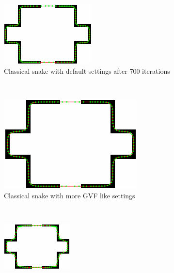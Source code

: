 \documentclass[a4paper]{article}
\begin{document}
\begin{figure}
	\centering
	\begin{subfigure}[t]{.3\textwidth}
		\includegraphics[width=\textwidth]{firstclass}
		\caption{Classical snake with default settings after 700 iterations}
	\end{subfigure}~
	\begin{subfigure}[t]{.3\textwidth}
		\includegraphics[width=\textwidth]{secondclass}
		\caption{Classical snake with more GVF like settings}
	\end{subfigure}~
	\begin{subfigure}[t]{.3\textwidth}
		\includegraphics[width=\textwidth]{firstgvf}

\end{subfigure}
\end{figure}
\end{document}
